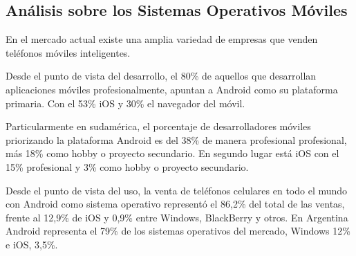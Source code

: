 \subsection{Análisis sobre los Sistemas Operativos Móviles}
\label{sistemas_operativos}

En el mercado actual existe una amplia variedad de empresas que venden
teléfonos móviles inteligentes.

Desde el punto de vista del desarrollo, el 80\% de aquellos que desarrollan
aplicaciones móviles profesionalmente, apuntan a Android como su plataforma
primaria. Con el 53\% iOS y 30\% el navegador del móvil\cite{DevNation2}.


Particularmente en sudamérica, el porcentaje de desarrolladores móviles
priorizando la plataforma Android es del 38\% de manera profesional profesional,
más 18\% como hobby o proyecto secundario. En segundo lugar está iOS con el 15\%
profesional y 3\% como hobby o proyecto secundario\cite{DevNation2}.

Desde el punto de vista del uso, la venta de teléfonos celulares en todo el
mundo con Android como sistema operativo representó el 86,2\% del total de las
ventas, frente al 12,9\% de iOS y 0,9\% entre Windows, BlackBerry y otros.
En Argentina Android representa el 79\% de los sistemas operativos del mercado,
Windows 12\% e iOS, 3,5\%\cite{SmartphoneMarketShare}.
